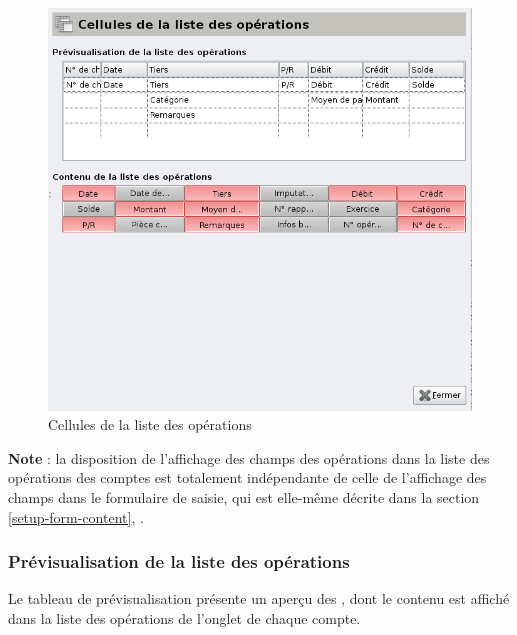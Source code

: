 \ifIllustration
\begin{figure}[ht]
\begin{center}
\includegraphics[scale=0.5]{image/screenshot/setup_listCells}
\end{center}
\caption{Cellules de la liste des opérations}
\label{setup-listCells-img}
\end{figure}
\fi

\textbf{Note} : la disposition de l'affichage des champs des opérations dans la liste des opérations des comptes est totalement indépendante de celle de  l'affichage des champs dans le formulaire de saisie, qui est elle-même décrite dans la section \vref{setup-form-content}, .

\ifIllustration
\else
\fi


\subsubsection{Prévisualisation de la liste des opérations\label{setup-operations-cells-display}}

Le tableau de prévisualisation présente un aperçu des , dont le contenu est affiché dans la liste des opérations de l'onglet   de chaque compte.

